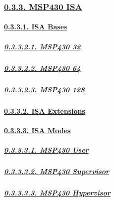 \documentclass[
]{article}
\begin{document}
\hypertarget{msp430-isa}{%
\subsubsection{\texorpdfstring{\protect\hyperlink{msp430-isa-1}{0.3.3.
MSP430 ISA}}{0.3.3. MSP430 ISA}}\label{msp430-isa}}

\hypertarget{isa-bases-2}{%
\paragraph{\texorpdfstring{\protect\hyperlink{isa-bases-5}{0.3.3.1. ISA
Bases}}{0.3.3.1. ISA Bases}}\label{isa-bases-2}}

\hypertarget{msp430-32}{%
\subparagraph{\texorpdfstring{\protect\hyperlink{msp430-32-1}{0.3.3.2.1.
MSP430 32}}{0.3.3.2.1. MSP430 32}}\label{msp430-32}}

\hypertarget{msp430-64}{%
\subparagraph{\texorpdfstring{\protect\hyperlink{msp430-64-1}{0.3.3.2.2.
MSP430 64}}{0.3.3.2.2. MSP430 64}}\label{msp430-64}}

\hypertarget{msp430-128}{%
\subparagraph{\texorpdfstring{\protect\hyperlink{msp430-128-1}{0.3.3.2.3.
MSP430 128}}{0.3.3.2.3. MSP430 128}}\label{msp430-128}}

\hypertarget{isa-extensions-2}{%
\paragraph{\texorpdfstring{\protect\hyperlink{isa-extensions-5}{0.3.3.2.
ISA Extensions}}{0.3.3.2. ISA Extensions}}\label{isa-extensions-2}}

\hypertarget{isa-modes-2}{%
\paragraph{\texorpdfstring{\protect\hyperlink{isa-modes-5}{0.3.3.3. ISA
Modes}}{0.3.3.3. ISA Modes}}\label{isa-modes-2}}

\hypertarget{msp430-user}{%
\subparagraph{\texorpdfstring{\protect\hyperlink{msp430-user-1}{0.3.3.3.1.
MSP430 User}}{0.3.3.3.1. MSP430 User}}\label{msp430-user}}

\hypertarget{msp430-supervisor}{%
\subparagraph{\texorpdfstring{\protect\hyperlink{msp430-supervisor-1}{0.3.3.3.2.
MSP430
Supervisor}}{0.3.3.3.2. MSP430 Supervisor}}\label{msp430-supervisor}}

\hypertarget{msp430-hypervisor}{%
\subparagraph{\texorpdfstring{\protect\hyperlink{msp430-hypervisor-1}{0.3.3.3.3.
MSP430
Hypervisor}}{0.3.3.3.3. MSP430 Hypervisor}}\label{msp430-hypervisor}}
\end{document}
